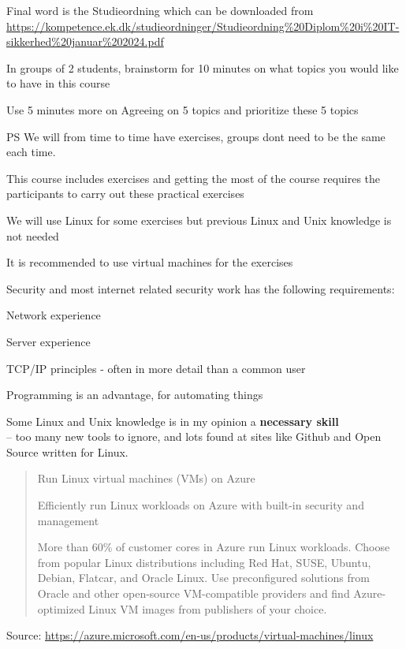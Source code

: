 \documentclass[Screen16to9,17pt]{foils}
\begin{document}
Final word is the Studieordning which can be downloaded from\\
{\footnotesize \url{https://kompetence.ek.dk/studieordninger/Studieordning%20Diplom%20i%20IT-sikkerhed%20januar%202024.pdf}}




In groups of 2 students, brainstorm for 10 minutes on what topics you would like to have in this course

Use 5 minutes more on Agreeing on 5 topics and prioritize these 5 topics

\vskip 1cm
PS We will from time to time have exercises, groups dont need to be the same each time.



\begin{list1}
\item This course includes exercises and getting the most of the course requires the participants to carry out these practical exercises
\item We will use Linux for some exercises but previous Linux and Unix knowledge is not needed
\item It is recommended to use virtual machines for the exercises
\item Security and most internet related security work has the following requirements:
\begin{list2}
\item Network experience
\item Server experience
\item TCP/IP principles - often in more detail than a common user
\item Programming is an advantage, for automating things
\item Some Linux and Unix knowledge is in my opinion a {\bf necessary skill}\\
-- too many new tools to ignore, and lots found at sites like Github and Open Source written for Linux.
\end{list2}
\end{list1}



\begin{quote}


{\Large Run Linux virtual machines (VMs) on Azure}

Efficiently run Linux workloads on Azure with built-in security and management

More than 60\% of customer cores in Azure run Linux workloads. Choose from popular Linux distributions including Red Hat, SUSE, Ubuntu, Debian, Flatcar, and Oracle Linux. Use preconfigured solutions from Oracle and other open-source VM-compatible providers and find Azure-optimized Linux VM images from publishers of your choice.
\end{quote}
Source: \url{https://azure.microsoft.com/en-us/products/virtual-machines/linux}
\end{document}
